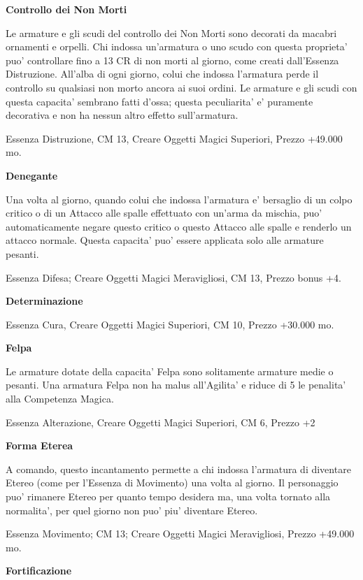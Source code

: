 \documentclass[a4paper,11pt,twoside,openany]{book}
\begin{document}
{		\textbf{Controllo dei Non Morti}
		
		Le armature e gli scudi del controllo dei Non Morti sono decorati da macabri ornamenti e orpelli. Chi indossa un'armatura o uno scudo con questa proprieta' puo' controllare fino a 13 CR di non morti al giorno, come creati dall'Essenza Distruzione. All'alba di ogni giorno, colui che indossa l'armatura perde il controllo su qualsiasi non morto ancora ai suoi ordini. Le armature e gli scudi con questa capacita' sembrano fatti d'ossa; questa peculiarita' e' puramente decorativa e non ha nessun altro effetto sull'armatura.
		
		Essenza Distruzione, CM 13, Creare Oggetti Magici Superiori, Prezzo +49.000 mo.
		
		\textbf{Denegante}
		
		Una volta al giorno, quando colui che indossa l'armatura e' bersaglio di un colpo critico o di un Attacco alle spalle effettuato con un'arma da mischia, puo' automaticamente negare questo critico o questo Attacco alle spalle e renderlo un attacco normale. Questa capacita' puo' essere applicata solo alle armature pesanti.
		
		Essenza Difesa; Creare Oggetti Magici Meravigliosi, CM 13, Prezzo bonus +4.
		
		\textbf{Determinazione}
		
		Essenza Cura, Creare Oggetti Magici Superiori, CM 10, Prezzo +30.000
		mo.
		
		\textbf{Felpa}
		
		Le armature dotate della capacita' Felpa sono solitamente armature medie o pesanti. Una armatura Felpa non ha malus all'Agilita' e riduce di 5 le penalita' alla Competenza Magica.
		
		Essenza Alterazione, Creare Oggetti Magici Superiori, CM 6, Prezzo
		+2
		
		\textbf{Forma Eterea}
		
		A comando, questo incantamento permette a chi indossa l'armatura di diventare Etereo (come per l'Essenza di Movimento) una volta al giorno. Il personaggio puo' rimanere Etereo per quanto tempo desidera ma, una volta tornato alla normalita', per quel giorno non puo' piu' diventare Etereo.
		
		Essenza Movimento; CM 13; Creare Oggetti Magici Meravigliosi, Prezzo +49.000 mo.
		
		\textbf{Fortificazione}
		
}
\end{document}
